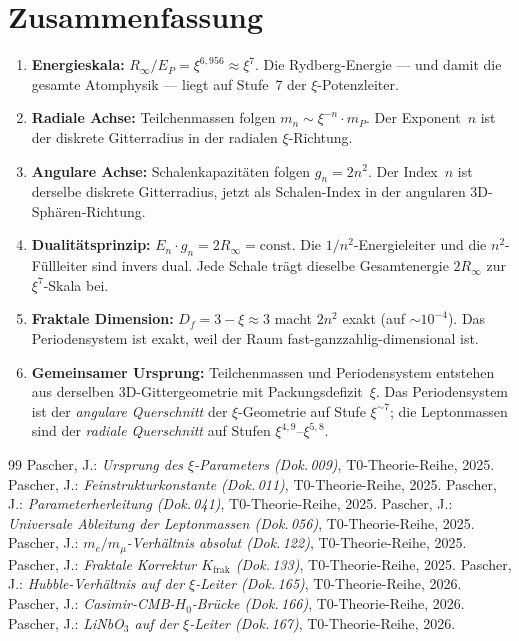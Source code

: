 \section{Zusammenfassung}
\label{sec:ps-zusammenfassung}

\begin{enumerate}
  \item \textbf{Energieskala:} $R_\infty / E_P = \xi^{6{,}956} \approx \xi^7$.
    Die Rydberg-Energie — und damit die gesamte Atomphysik — liegt auf
    Stufe~7 der $\xi$-Potenzleiter.

  \item \textbf{Radiale Achse:} Teilchenmassen folgen $m_n \sim \xi^{-n} \cdot m_P$.
    Der Exponent~$n$ ist der diskrete Gitterradius in der radialen $\xi$-Richtung.

  \item \textbf{Angulare Achse:} Schalenkapazitäten folgen $g_n = 2n^2$.
    Der Index~$n$ ist derselbe diskrete Gitterradius, jetzt als Schalen-Index
    in der angularen 3D-Sphären-Richtung.

  \item \textbf{Dualitätsprinzip:} $E_n \cdot g_n = 2R_\infty = \text{const}$.
    Die $1/n^2$-Energieleiter und die $n^2$-Füllleiter sind invers dual.
    Jede Schale trägt dieselbe Gesamtenergie $2R_\infty$ zur $\xi^7$-Skala bei.

  \item \textbf{Fraktale Dimension:} $D_f = 3 - \xi \approx 3$ macht $2n^2$ exakt
    (auf $\sim 10^{-4}$). Das Periodensystem ist exakt, weil der Raum
    fast-ganzzahlig-dimensional ist.

  \item \textbf{Gemeinsamer Ursprung:} Teilchenmassen und Periodensystem
    entstehen aus derselben 3D-Gittergeometrie mit Packungsdefizit~$\xi$.
    Das Periodensystem ist der \emph{angulare Querschnitt} der $\xi$-Geometrie
    auf Stufe $\xi^{\sim 7}$; die Leptonmassen sind der \emph{radiale Querschnitt}
    auf Stufen $\xi^{4{,}9}$–$\xi^{5{,}8}$.
\end{enumerate}

\begin{thebibliography}{99}
 Pascher, J.: \emph{Ursprung des $\xi$-Parameters (Dok.\,009)},
  T0-Theorie-Reihe, 2025.
 Pascher, J.: \emph{Feinstrukturkonstante (Dok.\,011)},
  T0-Theorie-Reihe, 2025.
 Pascher, J.: \emph{Parameterherleitung (Dok.\,041)},
  T0-Theorie-Reihe, 2025.
 Pascher, J.: \emph{Universale Ableitung der Leptonmassen (Dok.\,056)},
  T0-Theorie-Reihe, 2025.
 Pascher, J.: \emph{$m_e/m_\mu$-Verhältnis absolut (Dok.\,122)},
  T0-Theorie-Reihe, 2025.
 Pascher, J.: \emph{Fraktale Korrektur $K_\text{frak}$ (Dok.\,133)},
  T0-Theorie-Reihe, 2025.
 Pascher, J.: \emph{Hubble-Verhältnis auf der $\xi$-Leiter (Dok.\,165)},
  T0-Theorie-Reihe, 2026.
 Pascher, J.: \emph{Casimir-CMB-$H_0$-Brücke (Dok.\,166)},
  T0-Theorie-Reihe, 2026.
 Pascher, J.: \emph{LiNbO$_3$ auf der $\xi$-Leiter (Dok.\,167)},
  T0-Theorie-Reihe, 2026.
\end{thebibliography}
